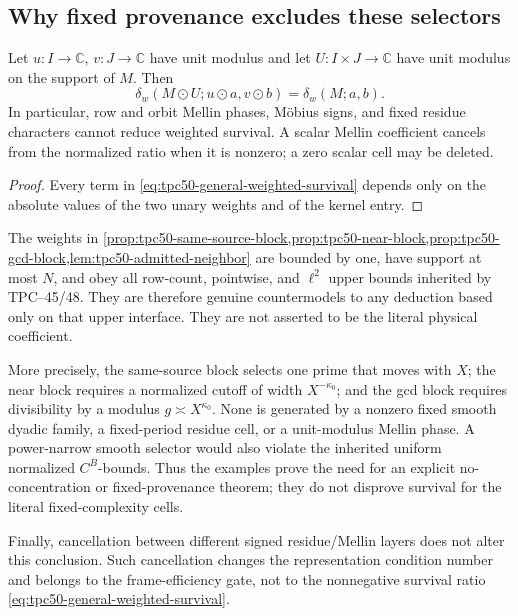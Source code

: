\subsection{Why fixed provenance excludes these selectors}

\begin{proposition}
\label{prop:tpc50-unit-phase-immunity}
Let \(u:I\to\mathbb C\), \(v:J\to\mathbb C\) have unit modulus and
let \(U:I\times J\to\mathbb C\) have unit modulus on the support of
\(M\).  Then
\begin{equation}
 \delta_w(M\odot U;u\odot a,v\odot b)
 =\delta_w(M;a,b).
 \label{eq:tpc50-unit-phase-invariance}
\end{equation}
In particular, row and orbit Mellin phases, M\"obius signs, and fixed
residue characters cannot reduce weighted survival.  A scalar Mellin
coefficient cancels from the normalized ratio when it is nonzero; a
zero scalar cell may be deleted.
\end{proposition}

\begin{proof}
Every term in \eqref{eq:tpc50-general-weighted-survival} depends only on the
absolute values of the two unary weights and of the kernel entry.
\end{proof}

\begin{remark}
\label{rem:tpc50-obstruction-provenance-boundary}
The weights in
\cref{prop:tpc50-same-source-block,prop:tpc50-near-block,prop:tpc50-gcd-block,lem:tpc50-admitted-neighbor}
are bounded by one, have support at most \(N\), and obey all row-count,
pointwise, and \(\ell^2\) upper bounds inherited by TPC--45/48.  They
are therefore genuine countermodels to any deduction based only on
that upper interface.  They are not asserted to be the literal
physical coefficient.

More precisely, the same-source block selects one prime that moves
with \(X\); the near block requires a normalized cutoff of width
\(X^{-\kappa_0}\); and the gcd block requires divisibility by a modulus
\(g\asymp X^{\kappa_0}\).  None is generated by a nonzero fixed smooth
dyadic family, a fixed-period residue cell, or a unit-modulus Mellin
phase.  A power-narrow smooth selector would also violate the inherited
uniform normalized \(C^B\)-bounds.  Thus the examples prove the need
for an explicit no-concentration or fixed-provenance theorem; they do
not disprove survival for the literal fixed-complexity cells.

Finally, cancellation between different signed residue/Mellin layers
does not alter this conclusion.  Such cancellation changes the
representation condition number and belongs to the frame-efficiency
gate, not to the nonnegative survival ratio
\eqref{eq:tpc50-general-weighted-survival}.
\end{remark}
